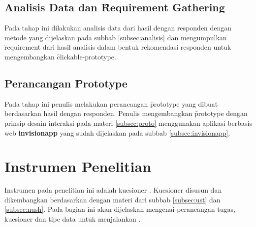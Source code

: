 \subsection{Analisis Data dan \f{Requirement Gathering}}
Pada tahap ini dilakukan analisis data dari hasil \ust \space dengan responden  dengan metode yang dijelaskan pada subbab \ref{subsec:analisis} dan mengumpulkan \f{requirement} dari hasil analisis dalam bentuk rekomendasi responden untuk mengembangkan \f{clickable-prototype}. 
\subsection{Perancangan \f{Prototype}}
Pada tahap ini penulis melakukan perancangan \f{prototype} yang dibuat berdasarkan hasil \ust \space dengan responden. Penulis mengembangkan \f{prototype} dengan prinsip desain interaksi pada materi \ref{subsec:proto} menggunakan aplikasi berbasis web \textbf{invisionapp} yang sudah dijelaskan pada subbab \ref{subsec:invisionapp}. 
\section{Instrumen Penelitian} \label{subsec:instrumen}
Instrumen pada penelitian ini adalah kuesioner \ust. Kuesioner disusun dan dikembangkan berdasarkan dengan materi dari subbab \ref{subsec:ust} dan \ref{subsec:nush}. Pada bagian ini akan dijelaskan mengenai perancangan tugas, kuesioner dan tipe data untuk menjalankan \ust. 
